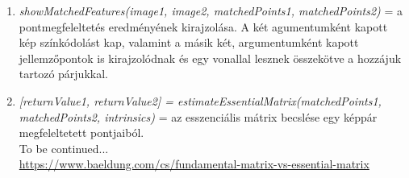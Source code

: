 \documentclass[12pt]{report}
\begin{document}
\begin{enumerate}
                    \item \textit{showMatchedFeatures(image1, image2, matchedPoints1, matchedPoints2)} = a pontmegfeleltetés eredményének kirajzolása. A két agumentumként kapott kép színkódolást kap, valamint a másik két, argumentumként kapott jellemzőpontok is kirajzolódnak és egy vonallal lesznek összekötve a hozzájuk tartozó párjukkal.
                    \item \textit{[returnValue1, returnValue2] = estimateEssentialMatrix(matchedPoints1, matchedPoints2, intrinsics)} = az esszenciális mátrix becslése egy képpár megfeleltetett pontjaiból.
                    \\To be continued...\\
                    \url{https://www.baeldung.com/cs/fundamental-matrix-vs-essential-matrix}
                \end{enumerate}
\end{document}
